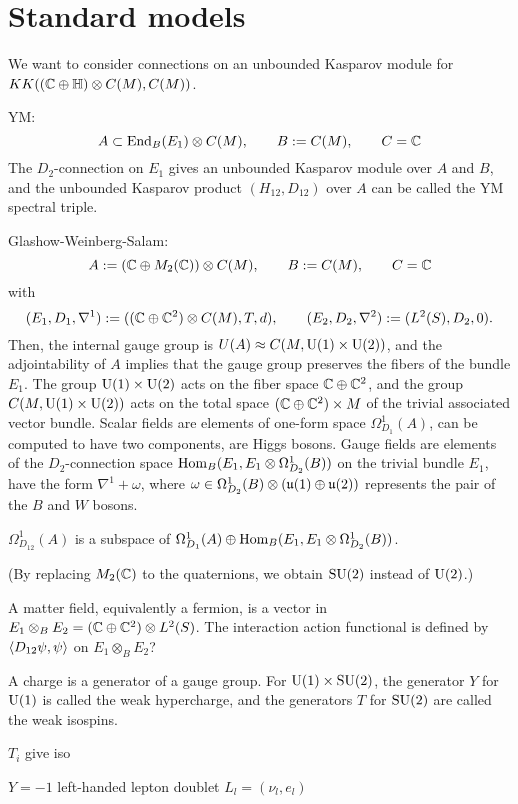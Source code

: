 \documentclass{../../large}
\begin{document}
\chapter{Standard models}

We want to consider connections on an unbounded Kasparov module for $KK((\mathbb{C}\oplus\mathbb{H})\otimes C(M),C(M))$.



YM:
\[A\subset\operatorname{End}_B(E_1)\otimes C(M),\qquad B:=C(M),\qquad C=\mathbb{C}\]
The $D_2$-connection on $E_1$ gives an unbounded Kasparov module over $A$ and $B$, and the unbounded Kasparov product $(H_{12},D_{12})$ over $A$ can be called the YM spectral triple.

Glashow-Weinberg-Salam:
\[A:=(\mathbb{C}\oplus M_2(\mathbb{C}))\otimes C(M),\qquad B:=C(M),\qquad C=\mathbb{C}\]
with
\[(E_1,D_1,\nabla^1):=((\mathbb{C}\oplus\mathbb{C}^2)\otimes C(M),T,d),\qquad(E_2,D_2,\nabla^2):=(L^2(S),D_2,0).\]
Then, the internal gauge group is $U(A)\approx C(M,\mathrm{U}(1)\times\mathrm{U}(2))$, and the adjointability of $A$ implies that the gauge group preserves the fibers of the bundle $E_1$.
The group $\mathrm{U}(1)\times\mathrm{U}(2)$ acts on the fiber space $\mathbb{C}\oplus\mathbb{C}^2$, and the group $C(M,\mathrm{U}(1)\times\mathrm{U}(2))$ acts on the total space $(\mathbb{C}\oplus\mathbb{C}^2)\times M$ of the trivial associated vector bundle.
Scalar fields are elements of one-form space $\Omega_{D_1}^1(A)$, can be computed to have two components, are Higgs bosons.
Gauge fields are elements of the $D_2$-connection space $\operatorname{Hom}_B(E_1,E_1\otimes\Omega_{D_2}^1(B))$ on the trivial bundle $E_1$, have the form $\nabla^1+\omega$, where $\omega\in\Omega_{D_2}^1(B)\otimes(\mathfrak{u}(1)\oplus\mathfrak{u}(2))$ represents the pair of the $B$ and $W$ bosons.

$\Omega_{D_{12}}^1(A)$ is a subspace of $\Omega_{D_1}^1(A)\oplus\operatorname{Hom}_B(E_1,E_1\otimes\Omega_{D_2}^1(B))$.

(By replacing $M_2(\mathbb{C})$ to the quaternions, we obtain $\mathrm{SU}(2)$ instead of $\mathrm{U}(2)$.)

A matter field, equivalently a fermion, is a vector in $E_1\otimes_BE_2=(\mathbb{C}\oplus\mathbb{C}^2)\otimes L^2(S)$.
The interaction action functional is defined by $\langle D_{12}\psi,\psi\rangle$ on $E_1\otimes_BE_2$?



A charge is a generator of a gauge group.
For $\mathrm{U}(1)\times\mathrm{SU}(2)$, the generator $Y$ for $\mathrm{U}(1)$ is called the weak hypercharge, and the generators $T$ for $\mathrm{SU}(2)$ are called the weak isospins.

$T_i$ give iso

$Y=-1$ left-handed lepton doublet $L_l=(\nu_l,e_l)$
\end{document}
